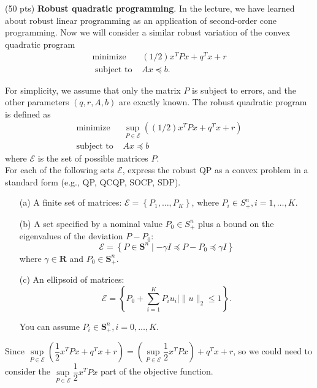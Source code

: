 \item {\color{red} (50 pts)} \textbf{Robust quadratic programming}. In the lecture, we have learned about robust linear programming as an application of second-order cone programming. Now we will consider a similar robust variation of the convex quadratic program
$$
\begin{array}{ll}
\operatorname{minimize} & (1 / 2) x^T P x+q^T x+r \\
\text { subject to } & A x \preceq b .
\end{array}
$$

For simplicity, we assume that only the matrix $P$ is subject to errors, and the other parameters $(q, r, A, b)$ are exactly known. The robust quadratic program is defined as
$$
\begin{array}{cl}
\operatorname{minimize} & \sup _{P \in \mathcal{E}}\left((1 / 2) x^T P x+q^T x+r\right) \\
\text {subject to } & A x \preceq b
\end{array}
$$
where $\mathcal{E}$ is the set of possible matrices $P$.\\
For each of the following sets $\mathcal{E}$, express the robust QP as a convex problem in a standard form (e.g., QP, QCQP, SOCP, SDP).
\begin{itemize}
    \item[(a)] A finite set of matrices: $\mathcal{E}=\left\{P_1, \ldots, P_K\right\}$, where $P_i \in S_{+}^n, i=1, \ldots, K$.
    \item[(b)] A set specified by a nominal value $P_0 \in S_{+}^n$ plus a bound on the eigenvalues of the deviation $P-P_0$:
    $$
    \mathcal{E}=\left\{P \in \mathbf{S}^n \mid-\gamma I \preceq P-P_0 \preceq \gamma I\right\}
    $$
    where $\gamma \in \mathbf{R}$ and $P_0 \in \mathbf{S}_{+}^n$.

    \item[(c)] An ellipsoid of matrices:
    $$
    \mathcal{E}=\left\{P_0+\sum_{i=1}^K P_i u_i \mid\|u\|_2 \leq 1\right\} .
    $$

    You can assume $P_i \in \mathbf{S}_{+}^n, i=0, \ldots, K$.
\end{itemize}

\solution{}
Since $\sup\limits_{P \in \mathcal{E}}\left(\dfrac{1}{2} x^T P x+q^T x+r\right)=\left(\sup\limits_{P \in \mathcal{E}}\dfrac{1}{2} x^T P x\right)+q^T x+r$, so we could need to consider the $\sup\limits_{P \in \mathcal{E}}\dfrac{1}{2} x^T P x$ part of the objective function.\\

